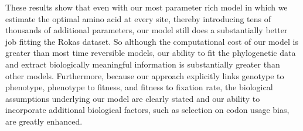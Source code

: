 These results show that even with our most parameter rich model in which we estimate the optimal amino acid at every site, thereby introducing tens of thousands of additional parameters, our model still does a substantially better job fitting the Rokas dataset.
So although the computational cost of our model is greater than most time reversible models,  our ability to fit the phylogenetic data and extract biologically meaningful information is substantially greater than other models.
Furthermore, because our approach explicitly links genotype to phenotype, phenotype to fitness, and fitness to fixation rate, the biological assumptions underlying our model are clearly stated and our ability to incorporate additional biological factors, such as selection on codon usage bias, are greatly enhanced.
 
